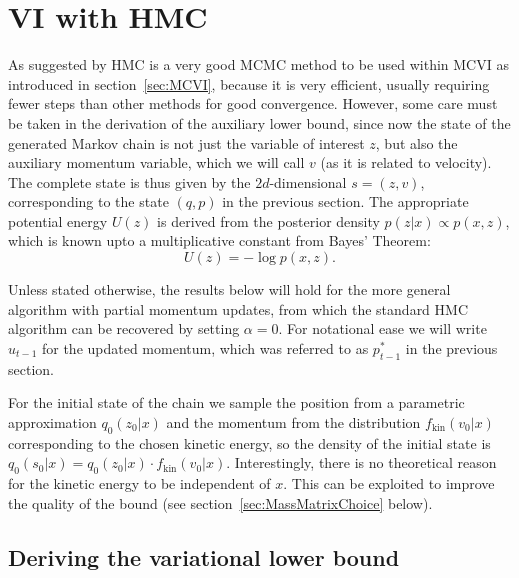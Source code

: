 \section{VI with HMC}
\label{sec:HMCVI}
As suggested by \textcite{Salimans2014} HMC is a very good MCMC method to be used within MCVI as introduced in section~\ref{sec:MCVI}, because it is very efficient, usually requiring fewer steps than other methods for good convergence. However, some care must be taken in the derivation of the auxiliary lower bound, since now the state of the generated Markov chain is not just the variable of interest $z$, but also the auxiliary momentum variable, which we will call $v$ (as it is related to velocity). The complete state is thus given by the $2d$-dimensional $s=(z, v)$, corresponding to the state $(q, p)$ in the previous section. The appropriate potential energy $U(z)$ is derived from the posterior density $p(z|x) \propto p(x, z)$, which is known upto a multiplicative constant from Bayes' Theorem:
\begin{equation} \label{eq:VIwithHMCPotEnergy}
U(z) = -\log p(x, z).
\end{equation}

Unless stated otherwise, the results below will hold for the more general algorithm with partial momentum updates, from which the standard HMC algorithm can be recovered by setting $\alpha = 0$. For notational ease we will write $u_{t-1}$ for the updated momentum, which was referred to as $p^*_{t-1}$ in the previous section. 

For the initial state of the chain we sample the position from a parametric approximation $q_0(z_0|x)$ and the momentum from the distribution $f_\textrm{kin}(v_0|x)$ corresponding to the chosen kinetic energy, so the density of the initial state is $q_0(s_0|x)=q_0(z_0|x) \cdot f_\textrm{kin}(v_0|x)$. Interestingly, there is no theoretical reason for the kinetic energy to be independent of $x$. This can be exploited to improve the quality of the bound (see section~\ref{sec:MassMatrixChoice} below). \label{sec:KinEnergyMayDependOnX}

\subsection{Deriving the variational lower bound}

